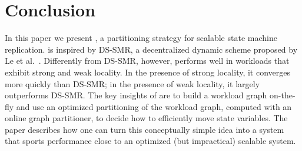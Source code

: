 \section{Conclusion}
\label{sec:conclusion}

In this paper we present \dynastar, a partitioning strategy for scalable state machine replication.
\dynastar is inspired by DS-SMR, a decentralized dynamic scheme proposed by Le et al.~\cite{hoang2016}.
Differently from DS-SMR, however, \dynastar performs well in workloads that exhibit strong and weak locality.
In the presence of strong locality, it converges more quickly than DS-SMR; in the presence of weak locality, it largely outperforms DS-SMR.
The key insights of \dynastar are to build a workload graph on-the-fly and use an optimized partitioning of the workload graph, computed with an online graph partitioner, to decide how to efficiently move state variables.
The paper describes how one can turn this conceptually simple idea into a system that sports performance close to an optimized (but impractical) scalable system.

